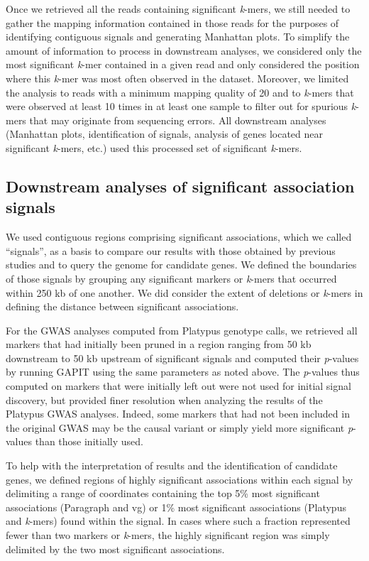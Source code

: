 Once we retrieved all the reads containing significant \emph{k}-mers, we still
needed to gather the mapping information contained in those reads for the
purposes of identifying contiguous signals and generating Manhattan plots. To
simplify the amount of information to process in downstream analyses, we
considered only the most significant \emph{k}-mer contained in a given read and
only considered the position where this \emph{k}-mer was most often observed in
the dataset. Moreover, we limited the analysis to reads with a minimum mapping
quality of 20 and to \emph{k}-mers that were observed at least 10 times in at
least one sample to filter out for spurious \emph{k}-mers that may originate
from sequencing errors. All downstream analyses (Manhattan plots,
identification of signals, analysis of genes located near significant
\emph{k}-mers, etc.) used this processed set of significant \emph{k}-mers.

\subsection{Downstream analyses of significant association signals}
\label{sv-gwas-methods-downstream}

We used contiguous regions comprising significant associations, which we called
``signals'', as a basis to compare our results with those obtained by previous
studies and to query the genome for candidate genes.  We defined the boundaries
of those signals by grouping any significant markers or \emph{k}-mers that
occurred within 250 kb of one another.  We did consider the extent of deletions
or \emph{k}-mers in defining the distance between significant associations.

For the GWAS analyses computed from Platypus genotype calls, we retrieved all
markers that had initially been pruned in a region ranging from 50 kb
downstream to 50 kb upstream of significant signals and computed their
\emph{p}-values by running GAPIT using the same parameters as noted above. The
\emph{p}-values thus computed on markers that were initially left out were not
used for initial signal discovery, but provided finer resolution when analyzing
the results of the Platypus GWAS analyses. Indeed, some markers that had not
been included in the original GWAS may be the causal variant or simply yield
more significant \emph{p}-values than those initially used.

To help with the interpretation of results and the identification of candidate
genes, we defined regions of highly significant associations within each signal
by delimiting a range of coordinates containing the top 5\% most significant
associations (Paragraph and vg) or 1\% most significant associations (Platypus
and \emph{k}-mers) found within the signal. In cases where such a fraction
represented fewer than two markers or \emph{k}-mers, the highly significant
region was simply delimited by the two most significant associations.

